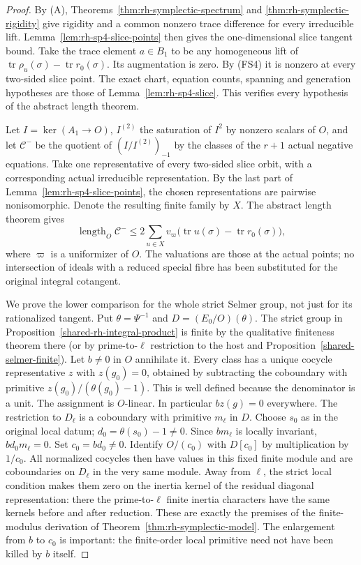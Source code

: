 \begin{proof}
By (A), Theorems~\ref{thm:rh-symplectic-spectrum}
and \ref{thm:rh-symplectic-rigidity} give rigidity
and a common nonzero trace difference for every
irreducible lift. Lemma~\ref{lem:rh-sp4-slice-points}
then gives the one-dimensional slice tangent bound.
Take the trace element \(a\in B_1\) to be any
homogeneous lift of
\(\operatorname{tr}\rho_u(\sigma)-\operatorname{tr}r_0(\sigma)\).
Its augmentation is zero. By (FS4) it is nonzero
at every two-sided slice point.
The exact chart, equation counts, spanning and
generation hypotheses are those of
Lemma~\ref{lem:rh-sp4-slice}. This verifies every
hypothesis of the abstract length theorem.

Let \(I=\ker(A_1\to O)\),
\(I^{(2)}\) the saturation of \(I^2\) by nonzero
scalars of \(O\), and let
\(\mathcal C^-\) be the quotient of
\((I/I^{(2)})_{-1}\) by the classes of the \(r+1\)
actual negative equations.
Take one representative of every two-sided slice
orbit, with a corresponding actual irreducible
representation. By the last part of
Lemma~\ref{lem:rh-sp4-slice-points}, the chosen
representations are pairwise nonisomorphic.
Denote the resulting finite family by \(X\).
The abstract length theorem gives
\[
   \operatorname{length}_O\mathcal C^-
       \le2\sum_{u\in X}
        v_\varpi\big(\operatorname{tr}u(\sigma)
                          -\operatorname{tr}r_0(\sigma)\big),
                                                               \tag{SL4}
\]
where \(\varpi\) is a uniformizer of \(O\).
The valuations are those at the actual points; no
intersection of ideals with a reduced special fibre
has been substituted for the original integral cotangent.

We prove the lower comparison for the whole strict
Selmer group, not just for its rationalized tangent.
Put \(\theta=\Psi^{-1}\) and \(D=(E_0/O)(\theta)\).
The strict group in Proposition~\ref{shared-rh-integral-product}
is finite by the qualitative finiteness theorem there
(or by prime-to-\(\ell\) restriction to the host and
Proposition~\ref{shared-selmer-finite}).
Let \(b\ne0\) in \(O\) annihilate it.
Every class has a unique cocycle representative
\(z\) with \(z(g_0)=0\), obtained by subtracting the
coboundary with primitive \(z(g_0)/(\theta(g_0)-1)\).
This is well defined because the denominator is a unit.
The assignment is \(O\)-linear. In particular
\(bz(g)=0\) everywhere.
The restriction to \(D_\ell\) is a coboundary with
primitive \(m_\ell\) in \(D\).
Choose \(s_0\) as in the original local datum;
\(d_0=\theta(s_0)-1\ne0\).
Since \(b m_\ell\) is locally invariant,
\(b d_0m_\ell=0\). Set \(c_0=bd_0\ne0\).
Identify \(O/(c_0)\) with \(D[c_0]\) by multiplication
by \(1/c_0\). All normalized cocycles then have values
in this fixed finite module and are coboundaries
on \(D_\ell\) in the very same module.
Away from \(\ell\), the strict local condition makes
them zero on the inertia kernel of the residual
diagonal representation: there the prime-to-\(\ell\)
finite inertia characters have the same kernels
before and after reduction.
These are exactly the premises of the finite-modulus
derivation of Theorem~\ref{thm:rh-symplectic-model}.
The enlargement from \(b\) to \(c_0\) is important:
the finite-order local primitive need not have been
killed by \(b\) itself.


\end{proof}
